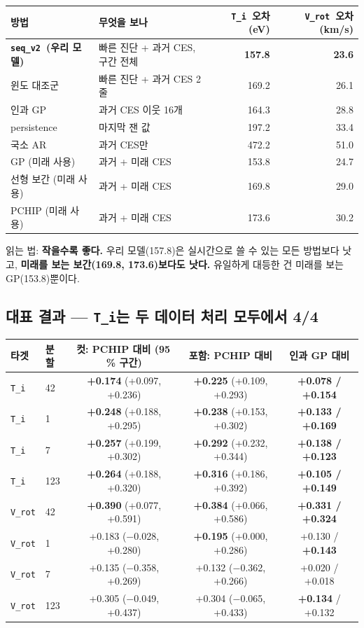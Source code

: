 \documentclass[10pt]{article}
\newcommand{\Ti}{\texttt{T\_i}}
\newcommand{\Vrot}{\texttt{V\_rot}}
\newcommand{\seqv}{\texttt{seq\_v2}}
\begin{document}
\begin{center}
\begin{tabularx}{\textwidth}{@{}l L r r@{}}
\toprule
\textbf{방법} & \textbf{무엇을 보나} & \textbf{\Ti\ 오차 (eV)} & \textbf{\Vrot\ 오차 (km/s)} \\
\midrule
\textbf{\seqv\ (우리 모델)} & 빠른 진단 + 과거 CES, 구간 전체 & \textbf{157.8} & \textbf{23.6} \\
윈도 대조군 & 빠른 진단 + 과거 CES 2줄 & 169.2 & 26.1 \\
인과 GP & 과거 CES 이웃 16개 & 164.3 & 28.8 \\
persistence & 마지막 잰 값 & 197.2 & 33.4 \\
국소 AR & 과거 CES만 & 472.2 & 51.0 \\
GP (미래 사용) & 과거 + 미래 CES & 153.8 & 24.7 \\
선형 보간 (미래 사용) & 과거 + 미래 CES & 169.8 & 29.0 \\
PCHIP (미래 사용) & 과거 + 미래 CES & 173.6 & 30.2 \\
\bottomrule
\end{tabularx}
\end{center}

읽는 법: \textbf{작을수록 좋다.} 우리 모델(157.8)은 실시간으로 쓸 수 있는 모든 방법보다
낫고, \textbf{미래를 보는 보간(169.8, 173.6)보다도 낫다.} 유일하게 대등한 건 미래를 보는
GP(153.8)뿐이다.

\subsection{대표 결과 --- \Ti 는 두 데이터 처리 모두에서 4/4}

\begin{center}
\begin{tabular}{@{}llccc@{}}
\toprule
\textbf{타겟} & \textbf{분할} & \textbf{컷: PCHIP 대비 (95\,\% 구간)} &
  \textbf{포함: PCHIP 대비} & \textbf{인과 GP 대비} \\
\midrule
\Ti & 42 & \textbf{+0.174} (+0.097, +0.236) & \textbf{+0.225} (+0.109, +0.293) & \textbf{+0.078 / +0.154} \\
\Ti & 1 & \textbf{+0.248} (+0.188, +0.295) & \textbf{+0.238} (+0.153, +0.302) & \textbf{+0.133 / +0.169} \\
\Ti & 7 & \textbf{+0.257} (+0.199, +0.302) & \textbf{+0.292} (+0.232, +0.344) & \textbf{+0.138 / +0.123} \\
\Ti & 123 & \textbf{+0.264} (+0.188, +0.320) & \textbf{+0.316} (+0.186, +0.392) & \textbf{+0.105 / +0.149} \\
\midrule
\Vrot & 42 & \textbf{+0.390} (+0.077, +0.591) & \textbf{+0.384} (+0.066, +0.586) & \textbf{+0.331 / +0.324} \\
\Vrot & 1 & +0.183 ($-$0.028, +0.280) & \textbf{+0.195} (+0.000, +0.286) & +0.130 / \textbf{+0.143} \\
\Vrot & 7 & +0.135 ($-$0.358, +0.269) & +0.132 ($-$0.362, +0.266) & +0.020 / +0.018 \\
\Vrot & 123 & +0.305 ($-$0.049, +0.437) & +0.304 ($-$0.065, +0.433) & \textbf{+0.134} / +0.132 \\
\bottomrule
\end{tabular}
\end{center}
\end{document}

